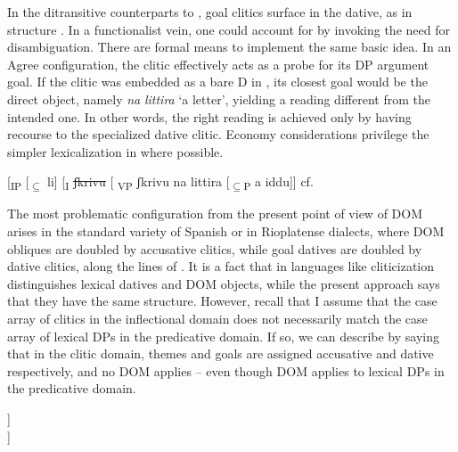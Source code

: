 \documentclass[output=paper]{langscibook}
\begin{document}
In the ditransitive counterparts to , goal clitics surface in the dative, as in structure . In a functionalist vein, one could account for  by invoking the need for disambiguation. There are formal means to implement the same basic idea. In an Agree configuration, the clitic effectively acts as a probe for its DP argument goal. If the clitic was embedded as a bare D in , its closest goal would be the direct object, namely \textit{na} \textit{littira} ‘a letter’, yielding a reading different from the intended one. In other words, the right reading is achieved only by having recourse to the specialized dative clitic. Economy considerations privilege the simpler lexicalization in  where possible.

\ea\label{ex:manzini:}
[\textsubscript{IP} [\textsubscript{${\subseteq}$} li] [\textsubscript{I} \sout{ʃkrivu}  [\textsubscript{ VP} ʃkrivu na littira  [\textsubscript{${\subseteq}$P} a iddu]]    \hfill cf. \\
\z

The most problematic configuration from the present point of view of DOM arises in the standard variety of Spanish or in Rioplatense dialects, where DOM obliques are doubled by accusative clitics, while goal datives are doubled by dative clitics, along the lines of . It is a fact that in languages like  cliticization distinguishes lexical datives and DOM objects, while the present approach says that they have the same structure. However, recall that I assume that the case array of clitics in the inflectional domain does not necessarily match the case array of lexical DPs in the predicative domain. If so, we can describe  by saying that in the clitic domain, themes and goals are assigned accusative and dative respectively, and no DOM applies – even though DOM applies to lexical DPs in the predicative domain.

\ea\label{ex:manzini:}
\begin{xlist}
\ex [\textsubscript{IP} [\textsubscript{D} lo]  [\textsubscript{I} vio   [\textsubscript{ VP} \sout{vio}  [\textsubscript{PP${\subseteq}$} a Juan]]\\
\ex [\textsubscript{IP} [\textsubscript{D${\subseteq}$} le] [\textsubscript{I} dio [\textsubscript{ VP} \sout{dio} el libro [\textsubscript{PP${\subseteq}$} a Juan]]     
\end{xlist} 
\z 
\end{document}
